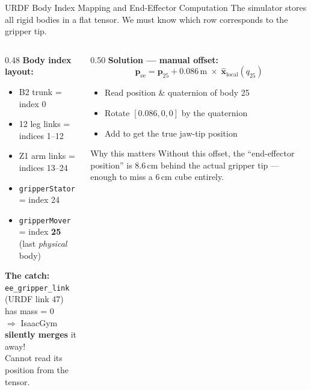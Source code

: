 \documentclass[10pt,aspectratio=169]{beamer}
\newenvironment{keybox}[1][Key Insight]{%
  \begin{exampleblock}{#1}}{\end{exampleblock}}
\begin{document}

\begin{frame}{URDF Body Index Mapping and End-Effector Computation}
  \small
  The simulator stores all rigid bodies in a flat tensor. We must know
  which row corresponds to the gripper tip.

  \vspace{4pt}
  \begin{columns}[T]
    \begin{column}{0.48\textwidth}
      \textbf{Body index layout:}
      \begin{itemize}
        \item B2 trunk = index 0
        \item 12 leg links = indices 1--12
        \item Z1 arm links = indices 13--24
        \item \texttt{gripperStator} = index 24
        \item \texttt{gripperMover} = index \textbf{25}\\
              (last \emph{physical} body)
      \end{itemize}

      \vspace{4pt}
      \textbf{The catch:}\\
      \texttt{ee\_gripper\_link} (URDF link 47) has mass = 0\\
      $\Rightarrow$ IsaacGym \textbf{silently merges} it away!\\
      Cannot read its position from the tensor.
    \end{column}
    \begin{column}{0.50\textwidth}
      \textbf{Solution --- manual offset:}
      \[
        \mathbf{p}_{\text{ee}} = \mathbf{p}_{25}
          + 0.086\,\text{m} \;\times\; \hat{\mathbf{x}}_{\text{local}}(q_{25})
      \]
      \begin{itemize}
        \item Read position \& quaternion of body 25
        \item Rotate $[0.086, 0, 0]$ by the quaternion
        \item Add to get the true jaw-tip position
      \end{itemize}

      \vspace{6pt}
      \begin{keybox}[Why this matters]
        Without this offset, the ``end-effector position'' is
        8.6\,cm behind the actual gripper tip ---
        enough to miss a 6\,cm cube entirely.
      \end{keybox}
    \end{column}
  \end{columns}
\end{frame}
\end{document}
